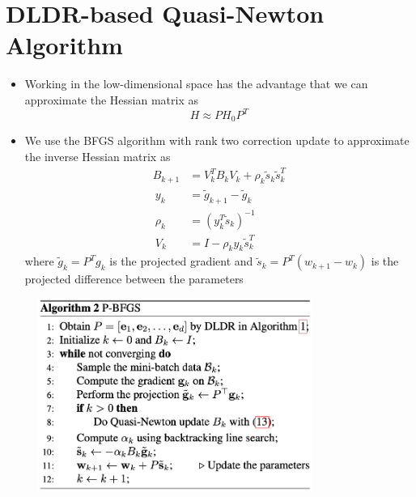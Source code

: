 \documentclass[t]{beamer}
\begin{document}

\section{DLDR-based Quasi-Newton Algorithm}

\begin{frame}
\begin{itemize}
\item Working in the low-dimensional space has the advantage that we can approximate the Hessian matrix as
\[ H \approx PH_0P^T \]
\item We use the BFGS algorithm with rank two correction update to approximate the inverse Hessian matrix as
\[ \begin{split}
B_{k+1} &= V_k^TB_kV_k + \rho_k\tilde{s}_k\tilde{s}_k^T \\\
y_k &= \tilde{g}_{k+1} - \tilde{g}_k \\\
\rho_k &= (y_k^T\tilde{s}_k)^{-1} \\\
V_k &= I - \rho_ky_k\tilde{s}_k^T
\end{split} \]
where $\tilde{g}_k = P^Tg_k$ is the projected gradient and $\tilde{s}_k = P^T(w_{k+1}-w_k)$ is the projected difference between the parameters
\end{itemize}
\end{frame}



\begin{frame}
\begin{figure}
\includegraphics[width=0.8\textwidth]{p-bfgs}
\end{figure}
\end{frame}

\end{document}
